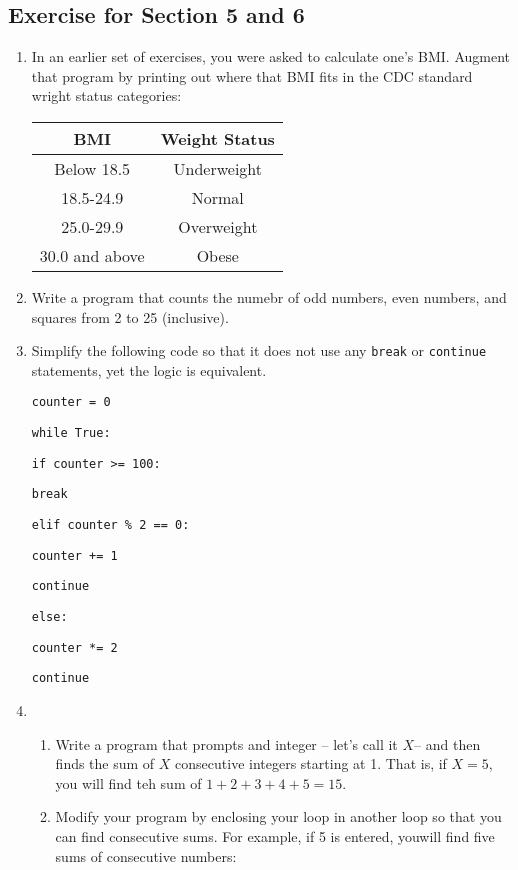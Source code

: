 \documentclass[14pt]{extarticle}
\begin{document}
\subsection{Exercise for Section 5 and 6}

\begin{enumerate}
	\item In an earlier set of exercises, you were asked to calculate one's BMI. Augment that program by printing out where that BMI fits in the CDC standard wright status categories:
	\begin{center}
		\begin{tabular}{|c|c|} \hline
		BMI & Weight Status \\ \hline
		Below 18.5 & Underweight \\ \hline
		18.5-24.9 & Normal \\ \hline
		25.0-29.9 & Overweight \\ \hline
		30.0 and above & Obese \\ \hline
		\end{tabular}
	\end{center}
	\item Write a program that counts the numebr of odd numbers, even numbers, and squares from 2 to 25 (inclusive).
	\item Simplify the following code so that it does not use any \texttt{break} or \texttt{continue} statements, yet the logic is equivalent.
	
	\texttt{counter = 0}
	
	\texttt{while True:}
	
	\quad \quad \texttt{if counter >= 100:}
	
	\quad \quad \quad \quad \texttt{break}
	
	\quad \quad \texttt{elif counter \% 2 == 0:}
	
	\quad \quad \quad \texttt{counter += 1}
	
	\quad \quad \quad \quad \texttt{continue}
	
	\quad \quad \texttt{else:}
	
	\quad \quad \quad \quad \texttt{counter *= 2}
	
	\quad \quad \quad \quad \texttt{continue}
	
	\item 
	\begin{enumerate}
		\item Write a program that prompts and integer -- let's call it $X$-- and then finds the sum of $X$ consecutive integers starting at 1. That is, if $X=5$, you will find teh sum of $1+2+3+4+5=15$.
		\item Modify your program by enclosing your loop in another loop so that you can find consecutive sums. For example, if 5 is entered, youwill find five sums of consecutive numbers:
		

\end{enumerate}
\end{enumerate}
\end{document}
